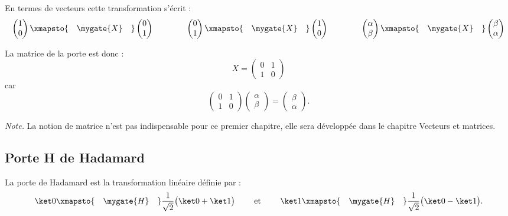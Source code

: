 \documentclass[11pt,class=report,crop=false]{standalone}
\begin{document}
En termes de vecteurs cette transformation s'écrit :
$$\begin{pmatrix}1\\0\end{pmatrix} \xmapsto{\quad\mygate{X}\quad} \begin{pmatrix}0\\1\end{pmatrix}
\qquad\qquad  \begin{pmatrix}0\\1\end{pmatrix} \xmapsto{\quad\mygate{X}\quad} \begin{pmatrix}1\\0\end{pmatrix}
\qquad\qquad  \begin{pmatrix}\alpha\\\beta\end{pmatrix} \xmapsto{\quad\mygate{X}\quad} \begin{pmatrix}\beta\\\alpha\end{pmatrix}
$$

La matrice de la porte  est donc :
$$X = \begin{pmatrix}0&1\\1&0\end{pmatrix}$$
car 
$$\begin{pmatrix}0&1\\1&0\end{pmatrix}
\begin{pmatrix}\alpha\\\beta\end{pmatrix}
= \begin{pmatrix}\beta\\\alpha\end{pmatrix}.$$


\emph{Note.} La notion de matrice n'est pas indispensable pour ce premier chapitre, elle sera développée dans le chapitre \og{}Vecteurs et matrices\fg{}.
 
\subsection{Porte H de Hadamard}

La porte  de Hadamard est la transformation linéaire définie par :
$$\ket 0 \xmapsto{\quad\mygate{H}\quad} \frac1{\sqrt2} \big(\ket0+\ket1\big) \qquad \text{ et } \qquad \ket 1 \xmapsto{\quad\mygate{H}\quad} \frac1{\sqrt2} \big(\ket0-\ket1\big).$$
\end{document}
